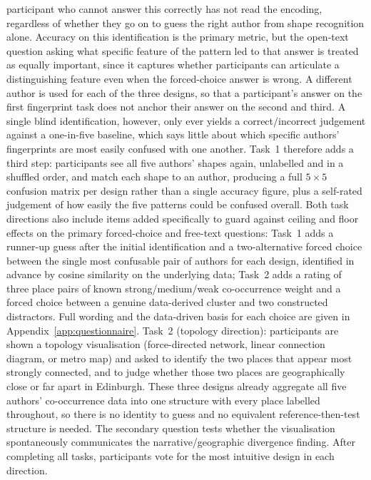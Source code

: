 \documentclass[logo,msc]{infthesis}
\begin{document}
participant who cannot answer this correctly has not read the encoding, regardless of whether they go on to guess the right author from shape recognition alone. Accuracy on this identification is the primary metric, but the open-text question asking what specific feature of the pattern led to that answer is treated as equally important, since it captures whether participants can articulate a distinguishing feature even when the forced-choice answer is wrong. A different author is used for each of the three designs, so that a participant's answer on the first fingerprint task does not anchor their answer on the second and third. A single blind identification, however, only ever yields a correct/incorrect judgement against a one-in-five baseline, which says little about which specific authors' fingerprints are most easily confused with one another. Task~1 therefore adds a third step: participants see all five authors' shapes again, unlabelled and in a shuffled order, and match each shape to an author, producing a full $5\times5$ confusion matrix per design rather than a single accuracy figure, plus a self-rated judgement of how easily the five patterns could be confused overall. Both task directions also include items added specifically to guard against ceiling and floor effects on the primary forced-choice and free-text questions: Task~1 adds a runner-up guess after the initial identification and a two-alternative forced choice between the single most confusable pair of authors for each design, identified in advance by cosine similarity on the underlying data; Task~2 adds a rating of three place pairs of known strong/medium/weak co-occurrence weight and a forced choice between a genuine data-derived cluster and two constructed distractors. Full wording and the data-driven basis for each choice are given in Appendix~\ref{app:questionnaire}. Task~2 (topology direction): participants are shown a topology visualisation (force-directed network, linear connection diagram, or metro map) and asked to identify the two places that appear most strongly connected, and to judge whether those two places are geographically close or far apart in Edinburgh. These three designs already aggregate all five authors' co-occurrence data into one structure with every place labelled throughout, so there is no identity to guess and no equivalent reference-then-test structure is needed. The secondary question tests whether the visualisation spontaneously communicates the narrative/geographic divergence finding. After completing all tasks, participants vote for the most intuitive design in each direction.
 
\end{document}
